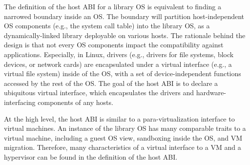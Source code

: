 The definition of the host ABI for a library OS
is equivalent to finding a narrowed boundary inside an OS.
The boundary will partition
host-independent OS components (e.g., the system call table) into 
the library OS, as a dynamically-linked library deployable
on various hosts.
The rationale behind the design is that not every OS components impact the compatibility against applications.
Especially, in Linux, drivers (e.g., drivers for file systems, block devices, or network cards) are encapsulated under a virtual interface (e.g., a virtual file system)
inside of the OS,
with a set of device-independent functions
accessed by the rest of the OS.
The goal of the host ABI is to declare a ubiquitous virtual interface,
which encapsulates the drivers and hardware-interfacing components of any hosts.




At the high level,  the host ABI is similar to a para-virtualization interface to virtual machines.
An instance of the \graphene{} library OS has many comparable traits to a virtual machine,
including a guest OS view, sandboxing inside the OS, and VM migration.
Therefore, many characteristics of a virtual interface to a VM and a hypervisor
can be found in the definition of the host ABI.






